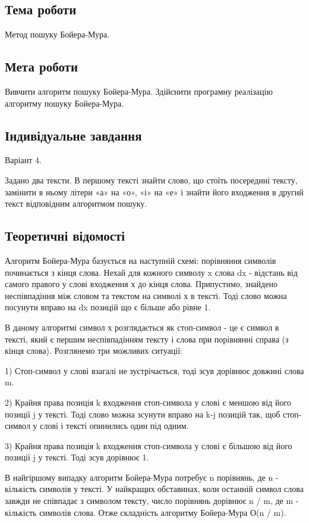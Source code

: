 \documentclass[12pt]{extarticle}
\begin{document}
\subsection*{Тема роботи} 
Метод пошуку Бойера-Мура.
\subsection*{Мета роботи}  Вивчити алгоритм пошуку Бойера-Мура. Здійснити програмну реалізацію алгоритму пошуку Бойера-Мура.

 
\subsection*{Індивідуальне завдання}
Варіант 4.

Задано два тексти. В першому тексті знайти слово, що стоїть посередині тексту, замінити в ньому літери «а» на «о», «і» на «е» і знайти його входження в другий текст відповідним алгоритмом пошуку.

\subsection*{Теоретичні відомості}
Алгоритм Бойера-Мура базується на наступній схемі: порівняння символів починається з кінця слова. Нехай для кожного символу x слова dx - відстань від самого правого у слові входження х до кінця слова. Припустимо, знайдено неспівпадіння між словом та текстом на символі х в тексті. Тоді слово можна посунути вправо на dx позицій що є більше або рівне 1.

В даному алгоритмі символ х розглядається як стоп-символ - це є символ в тексті, який є першим неспівпадінням тексту і слова при порівнянні справа (з кінця слова). Розглянемо три можливих ситуації:

1)    Стоп-символ у слові взагалі не зустрічається, тоді зсув дорівнює довжині слова m.

2)    Крайня права позиція k входження стоп-символа у слові є меншою від його позиції j у тексті. Тоді слово можна зсунути вправо на k-j позицій так, щоб стоп-символ у слові і тексті опинились один під одним.

3)    Крайня права позиція k входження стоп-символа у слові є більшою від його позиції j у тексті. Тоді зсув дорівнює 1.

 

В найгіршому випадку алгоритм Бойера-Мура потребує n порівнянь, де n - кількість символів у тексті. У найкращих обставинах, коли останній символ слова завжди не співпадає з символом тексту, число порівнянь дорівнює n / m, де m - кількість символів слова. Отже складність алгоритму Бойера-Мура О(n / m).
\end{document}
